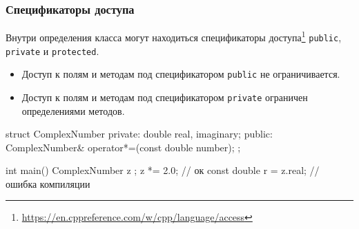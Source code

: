 \documentclass[compress, 8pt]{beamer}
\begin{document}
\begin{frame}[fragile]

    \frametitle{Спецификаторы доступа}

    \hfill\break
    Внутри определения класса могут находиться спецификаторы
    доступа\footnote{\url{https://en.cppreference.com/w/cpp/language/access}}
    \verb|public|, \verb|private| и \verb|protected|\footnotemark{}.


    \begin{itemize}
        \item Доступ к полям и методам под спецификатором \verb|public| не
            ограничивается.
        \item Доступ к полям и методам под спецификатором \verb|private|
            ограничен определениями методов.
    \end{itemize}

    \begin{myinplacelisting}[minted language=cpp]
struct ComplexNumber {
private:
    double real, imaginary;
public:
    ComplexNumber& operator*=(const double number);
};

int main() {
    ComplexNumber z {};
    z *= 2.0; // ок
    const double r = z.real; // ошибка компиляции
}
    \end{myinplacelisting}

\end{frame}
\end{document}
